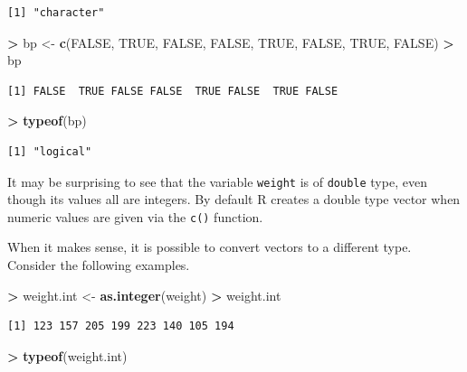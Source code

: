 \documentclass[]{krantz}
\makeatletter
\newenvironment{Shaded}{\begin{snugshade}}{\end{snugshade}}
\newcommand{\KeywordTok}[1]{\textcolor[rgb]{0.27,0.27,0.27}{\textbf{#1}}}
\newcommand{\NormalTok}[1]{#1}
\newcommand{\OperatorTok}[1]{\textcolor[rgb]{0.43,0.43,0.43}{\textbf{#1}}}
\newcommand{\OtherTok}[1]{\textcolor[rgb]{0.37,0.37,0.37}{#1}}
\newcommand{\StringTok}[1]{\textcolor[rgb]{0.5,0.5,0.5}{#1}}
\newenvironment{kframe}{%
\medskip{}
\setlength{\fboxsep}{.8em}
 \def\at@end@of@kframe{}%
 \ifinner\ifhmode%
  \def\at@end@of@kframe{\end{minipage}}%
  \begin{minipage}{\columnwidth}%
 \fi\fi%
 \def\FrameCommand##1{\hskip\@totalleftmargin \hskip-\fboxsep
 \colorbox{shadecolor}{##1}\hskip-\fboxsep
     \hskip-\linewidth \hskip-\@totalleftmargin \hskip\columnwidth}%
 \MakeFramed {\advance\hsize-\width
   \@totalleftmargin\z@ \linewidth\hsize
   \@setminipage}}%
 {\par\unskip\endMakeFramed%
 \at@end@of@kframe}
\renewenvironment{Shaded}{\begin{kframe}}{\end{kframe}}
\makeatother
\begin{document}
\begin{verbatim}
[1] "character"
\end{verbatim}

\begin{Shaded}
\begin{Highlighting}[]
\OperatorTok{>}\StringTok{ }\NormalTok{bp <-}\StringTok{ }\KeywordTok{c}\NormalTok{(}\OtherTok{FALSE}\NormalTok{, }\OtherTok{TRUE}\NormalTok{, }\OtherTok{FALSE}\NormalTok{, }\OtherTok{FALSE}\NormalTok{, }\OtherTok{TRUE}\NormalTok{, }\OtherTok{FALSE}\NormalTok{, }\OtherTok{TRUE}\NormalTok{, }\OtherTok{FALSE}\NormalTok{)}
\OperatorTok{>}\StringTok{ }\NormalTok{bp}
\end{Highlighting}
\end{Shaded}

\begin{verbatim}
[1] FALSE  TRUE FALSE FALSE  TRUE FALSE  TRUE FALSE
\end{verbatim}

\begin{Shaded}
\begin{Highlighting}[]
\OperatorTok{>}\StringTok{ }\KeywordTok{typeof}\NormalTok{(bp)}
\end{Highlighting}
\end{Shaded}

\begin{verbatim}
[1] "logical"
\end{verbatim}

It may be surprising to see that the variable \texttt{weight} is of \texttt{double} type, even though its values all are integers. By default R creates a double type vector when numeric values are given via the \texttt{c()} function.

When it makes sense, it is possible to convert vectors to a different type. Consider the following examples.

\begin{Shaded}
\begin{Highlighting}[]
\OperatorTok{>}\StringTok{ }\NormalTok{weight.int <-}\StringTok{ }\KeywordTok{as.integer}\NormalTok{(weight)}
\OperatorTok{>}\StringTok{ }\NormalTok{weight.int}
\end{Highlighting}
\end{Shaded}

\begin{verbatim}
[1] 123 157 205 199 223 140 105 194
\end{verbatim}

\begin{Shaded}
\begin{Highlighting}[]
\OperatorTok{>}\StringTok{ }\KeywordTok{typeof}\NormalTok{(weight.int)}
\end{Highlighting}
\end{Shaded}
\end{document}
